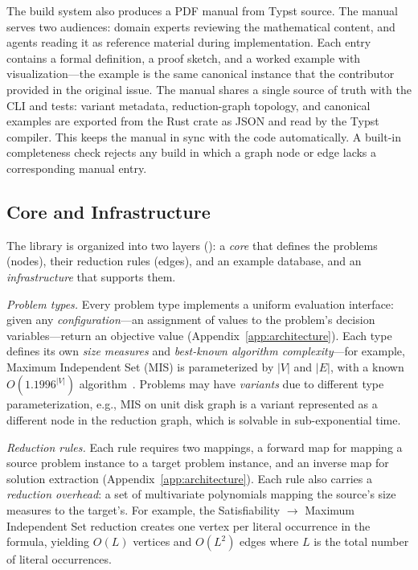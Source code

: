 \documentclass[conference]{IEEEtran}
\begin{document}
The build system also produces a PDF manual from Typst source.
The manual serves two audiences: domain experts reviewing the mathematical content, and agents reading it as reference material during implementation.
Each entry contains a formal definition, a proof sketch, and a worked example with visualization---the example is the same canonical instance that the contributor provided in the original issue.
The manual shares a single source of truth with the CLI and tests: variant metadata, reduction-graph topology, and canonical examples are exported from the Rust crate as JSON and read by the Typst compiler.
This keeps the manual in sync with the code automatically.
A built-in completeness check rejects any build in which a graph node or edge lacks a corresponding manual entry.

\subsection{Core and Infrastructure}\label{sec:graph-structure}

The library is organized into two layers (): a \emph{core} that defines the problems (nodes), their reduction rules (edges), and an example database, and an \emph{infrastructure} that supports them.

\emph{Problem types.}
Every problem type implements a uniform evaluation interface: given any \emph{configuration}---an assignment of values to the problem's decision variables---return an objective value (Appendix~\ref{app:architecture}).
Each type defines its own \emph{size measures} and \emph{best-known algorithm complexity}---for example, Maximum Independent Set (MIS) is parameterized by $|V|$ and $|E|$, with a known $O(1.1996^{|V|})$ algorithm~\cite{Xiao2017MIS}. Problems may have \emph{variants} due to different type parameterization, e.g., MIS on unit disk graph is a variant represented as a different node in the reduction graph, which is solvable in sub-exponential time.

\emph{Reduction rules.}
Each rule requires two mappings, a forward map for mapping a source problem instance to a target problem instance, and an inverse map for solution extraction (Appendix~\ref{app:architecture}).
Each rule also carries a \emph{reduction overhead}: a set of multivariate polynomials mapping the source's size measures to the target's.
For example, the Satisfiability $\to$ Maximum Independent Set reduction creates one vertex per literal occurrence in the formula, yielding $O(L)$ vertices and $O(L^2)$ edges where $L$ is the total number of literal occurrences.
\end{document}
